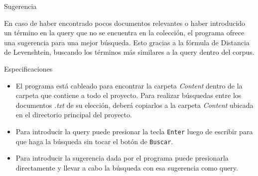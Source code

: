 \documentclass{beamer}
\begin{document}
\begin{frame}{Sugerencia}
    \begin{center}
        \large En caso de haber encontrado pocos documentos relevantes o haber introducido un término en la query que no se encuentra en la colección,
        el programa ofrece una sugerencia para una mejor búsqueda. Esto gracias a la fórmula de Distancia de Levenshtein, buscando los términos más similares a la query dentro del corpus.
    \end{center}
\end{frame}

\begin{frame}{Especificaciones}
    \begin{itemize}
        \item El programa está cableado para encontrar la carpeta \emph{Content} dentro de la carpeta que contiene a todo el proyecto. Para realizar búsquedas entre los documentos \emph{.txt} de su elección, deberá copiarlos a la carpeta \emph{Content} ubicada en el directorio principal del proyecto.
        \item Para introducir la query puede presionar la tecla \texttt{Enter} luego de escribir para que haga la búsqueda sin tocar el botón de \texttt{Buscar}.
        \item Para introducir la sugerencia dada por el programa puede presionarla directamente y llevar a cabo la búsqueda con esa sugerencia como query.
    \end{itemize}
\end{frame}
    
\end{document}
